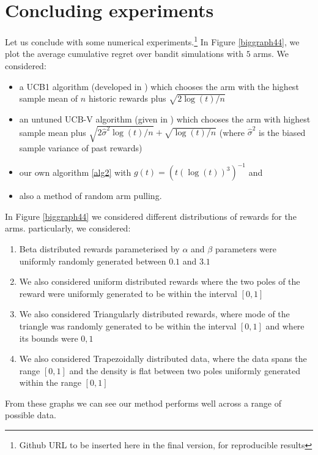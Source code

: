 \documentclass[12pt]{colt2020} %
\begin{document}
\section{Concluding experiments}\label{sec:conclusion}

Let us conclude with some numerical experiments.\footnote{Github URL to be inserted here in the final version, for reproducible results}
In Figure \ref{biggraph44}, we plot the average cumulative regret over bandit simulations with $5$ arms. We considered:
\begin{itemize}
\item a UCB1 algorithm (developed in \cite{Auer2002}) which chooses the arm with the highest sample mean of $n$ historic rewards plus $\sqrt{2\log(t)/n}$
\item an untuned UCB-V algorithm (given in \cite{audibert2009exploration}) which chooses the arm with highest sample mean plus $ \sqrt{2\hat{\sigma}^2\log(t)/n}+\sqrt{\log(t)/n} $ (where $\hat{\sigma}^2$ is the biased sample variance of past rewards)
\item our own algorithm \ref{alg2} with $g(t) = (t(\log(t))^3)^{-1}$ and 
\item also a method of random arm pulling.
\end{itemize}
\noindent
In Figure \ref{biggraph44} we considered different distributions of rewards for the arms. particularly, we considered:
\begin{enumerate}
\item Beta distributed rewards parameterised by $\alpha$ and $\beta$ parameters were uniformly randomly generated between $0.1$ and $3.1$
\item We also considered uniform distributed rewards where the two poles of the reward were uniformly generated to be within the interval $[0,1]$
\item We also considered Triangularly distributed rewards, where mode of the triangle was randomly generated to be within the interval $[0,1]$ and where its bounds were $0,1$
\item We also considered Trapezoidally distributed data, where the data spans the range $[0,1]$ and the density is flat between two poles uniformly generated within the range $[0,1]$
\end{enumerate}
\noindent
From these graphs we can see our method performs well across a range of possible data.


\end{document}
